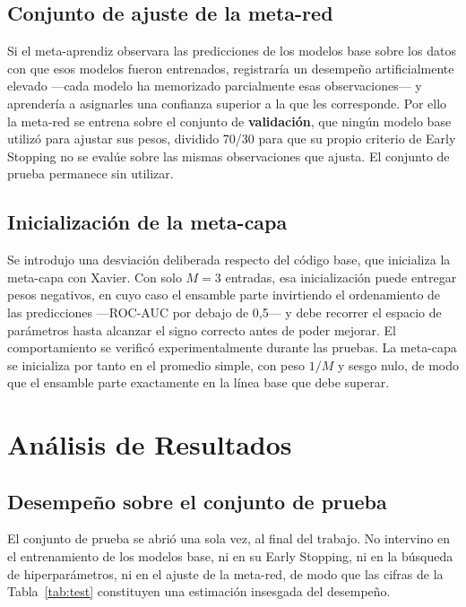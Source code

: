 \documentclass[12pt,a4paper]{article}
\begin{document}
\subsection{Conjunto de ajuste de la meta-red}

Si el meta-aprendiz observara las predicciones de los modelos base sobre los datos con que esos
modelos fueron entrenados, registraría un desempeño artificialmente elevado ---cada modelo ha
memorizado parcialmente esas observaciones--- y aprendería a asignarles una confianza superior a
la que les corresponde. Por ello la meta-red se entrena sobre el conjunto de \textbf{validación},
que ningún modelo base utilizó para ajustar sus pesos, dividido 70/30 para que su propio criterio
de Early Stopping no se evalúe sobre las mismas observaciones que ajusta. El conjunto de prueba
permanece sin utilizar.

\subsection{Inicialización de la meta-capa}

Se introdujo una desviación deliberada respecto del código base, que inicializa la meta-capa con
Xavier. Con solo $M=3$ entradas, esa inicialización puede entregar pesos negativos, en cuyo caso
el ensamble parte invirtiendo el ordenamiento de las predicciones ---ROC-AUC por debajo de 0,5---
y debe recorrer el espacio de parámetros hasta alcanzar el signo correcto antes de poder mejorar.
El comportamiento se verificó experimentalmente durante las pruebas. La meta-capa se inicializa
por tanto en el promedio simple, con peso $1/M$ y sesgo nulo, de modo que el ensamble parte
exactamente en la línea base que debe superar.

\section{Análisis de Resultados}

\subsection{Desempeño sobre el conjunto de prueba}

El conjunto de prueba se abrió una sola vez, al final del trabajo. No intervino en el
entrenamiento de los modelos base, ni en su Early Stopping, ni en la búsqueda de hiperparámetros,
ni en el ajuste de la meta-red, de modo que las cifras de la Tabla~\ref{tab:test} constituyen una
estimación insesgada del desempeño.
\end{document}

